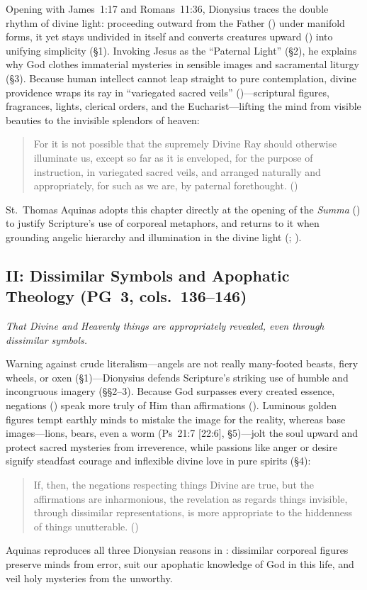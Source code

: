 Opening with James~1:17 and Romans~11:36, Dionysius traces the double rhythm of divine light: proceeding outward from the Father () under manifold forms, it yet stays undivided in itself and converts creatures upward () into unifying simplicity (\S 1). Invoking Jesus as the ``Paternal Light'' (\S 2), he explains why God clothes immaterial mysteries in sensible images and sacramental liturgy (\S 3). Because human intellect cannot leap straight to pure contemplation, divine providence wraps its ray in ``variegated sacred veils'' ()---scriptural figures, fragrances, lights, clerical orders, and the Eucharist---lifting the mind from visible beauties to the invisible splendors of heaven:
\begin{quotation}
For it is not possible that the supremely Divine Ray should otherwise illuminate us, except so far as it is enveloped, for the purpose of instruction, in variegated sacred veils, and arranged naturally and appropriately, for such as we are, by paternal forethought. ()
\end{quotation}
St.~Thomas Aquinas adopts this chapter directly at the opening of the \emph{Summa} () to justify Scripture's use of corporeal metaphors, and returns to it when grounding angelic hierarchy and illumination in the divine light (; ).

\subsection{II: Dissimilar Symbols and Apophatic Theology (PG~3, cols.~136--146)}
\label{sec:ch-ii}
\emph{That Divine and Heavenly things are appropriately revealed, even through dissimilar symbols.}

Warning against crude literalism---angels are not really many-footed beasts, fiery wheels, or oxen (\S 1)---Dionysius defends Scripture's striking use of humble and incongruous imagery (\S\S 2--3). Because God surpasses every created essence, negations () speak more truly of Him than affirmations (). Luminous golden figures tempt earthly minds to mistake the image for the reality, whereas base images---lions, bears, even a worm (Ps~21:7 [22:6], \S 5)---jolt the soul upward and protect sacred mysteries from irreverence, while passions like anger or desire signify steadfast courage and inflexible divine love in pure spirits (\S 4):
\begin{quotation}
If, then, the negations respecting things Divine are true, but the affirmations are inharmonious, the revelation as regards things invisible, through dissimilar representations, is more appropriate to the hiddenness of things unutterable. ()
\end{quotation}
Aquinas reproduces all three Dionysian reasons in : dissimilar corporeal figures preserve minds from error, suit our apophatic knowledge of God in this life, and veil holy mysteries from the unworthy.

